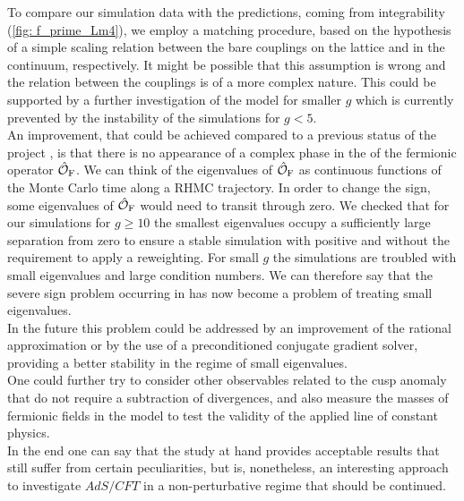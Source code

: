 To compare our simulation data with the predictions, coming from integrability (\autoref{fig: f_prime_Lm4}), we employ a matching procedure, based on the hypothesis of a simple scaling relation between the bare couplings on the lattice and in the continuum, respectively. It might be possible that this assumption is wrong and the relation between the couplings is of a more complex nature. This could be supported by a further investigation of the model for smaller $g$ which is currently prevented by the instability of the simulations for $g <5$.\\
An improvement, that could be achieved compared to a previous status of the project \cite{Bianchi:2016cyv}, is that there is no appearance of a complex phase in the  of the fermionic operator $\hat{\mathcal{O}}_{\rm F}$. We can think of the eigenvalues of $\hat{\mathcal{O}}_{\rm F}$ as continuous functions of the Monte Carlo time along a RHMC trajectory. In order to change the  sign, some eigenvalues of $\hat{\mathcal{O}}_{\rm F}$ would need to transit through zero. We checked that for our simulations for $g \geq 10$ the smallest eigenvalues occupy a sufficiently large separation from zero to ensure  a stable simulation with positive  and without the requirement to apply a reweighting. For small $g$ the simulations are troubled with small eigenvalues and large condition numbers. We can therefore say that the severe sign problem occurring in \cite{Bianchi:2016cyv} has now become a problem of treating small eigenvalues.\\
In the future this problem could be addressed by an improvement of the rational approximation or by the use of a preconditioned conjugate gradient solver, providing a better stability in the regime of small eigenvalues.\\
One could further try to consider other observables related to the cusp anomaly that do not require a subtraction of divergences, and also measure the masses of fermionic fields in the model to test the validity of the applied line of constant physics.\\
In the end one can say that the study at hand provides acceptable results that still suffer from certain peculiarities, but is, nonetheless, an interesting approach to investigate $AdS/CFT$ in a non-perturbative regime that should be continued.